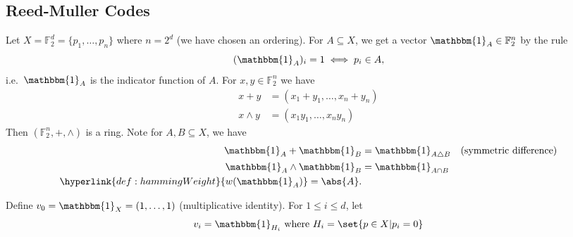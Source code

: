 \documentclass{article}
\newcommand{\F}{\mathbb{F}}
\newcommand{\1}[1]{\mathbbm{1}_{#1}}
\begin{document}
\color{black}
\subsection{Reed-Muller Codes}
Let $X = \F_2^d = \{p_1, \dotsc, p_n\}$ where $n = 2^d$ (we have chosen an ordering).
For $A \subseteq X$, we get a vector $\1{A} \in \F_2^n$ by the rule
\begin{equation*}
    (\1{A})_i = 1 \iff p_i \in A,
\end{equation*}
i.e.\ $\1{A}$ is the indicator function of $A$.
For $x, y \in \F_2^n$ we have
\begin{align*}
    x+y &= (x_1 + y_1, \dotsc, x_n + y_n) \\
    x \wedge y &= (x_1 y_1, \dotsc, x_n y_n)
\end{align*}
Then $(\F_2^n, +, \wedge)$ is a ring.
Note for $A, B \subseteq X$, we have
\begin{align*}
    \1{A} + \1{B} &= \1{A \bigtriangleup B} \quad \text{(symmetric difference)} \\
    \1{A} \wedge \1{B} &= \1{A \cap B} \\
    \hyperlink{def:hammingWeight}{w(\1{A})} = \abs{A}.
\end{align*}

Define $v_0 = \1{X} = (1, \dotsc, 1)$ (multiplicative identity). For $1 \leq i \leq d$, let
\begin{equation*}
    v_i = \1{H_i} \text{ where } H_i = \set{p \in X | p_i = 0}
\end{equation*}
\end{document}
